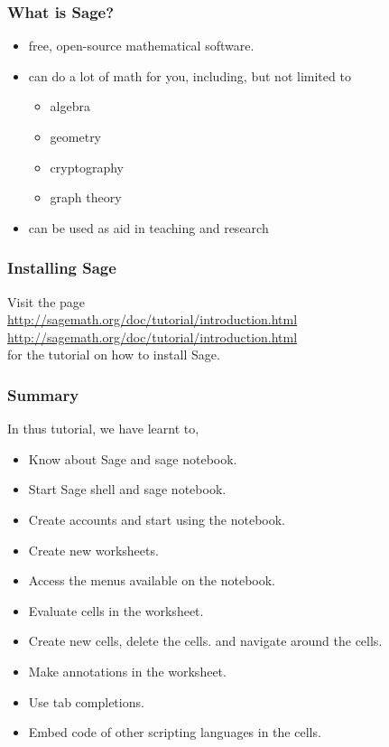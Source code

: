 \documentclass[presentation]{beamer}
\begin{document}
\begin{frame}
\frametitle{What is Sage?}
\label{sec-3}


\begin{itemize}
\item free, open-source mathematical software.
\item can do a lot of math for you, including, but not limited to
\begin{itemize}
\item algebra
\item geometry
\item cryptography
\item graph theory
\end{itemize}
\item can be used as aid in teaching and research
\end{itemize}
\end{frame}
\begin{frame}
\frametitle{Installing Sage}
\label{sec-4}

   Visit the page\\
\vspace{8pt}   
   \url{http://sagemath.org/doc/tutorial/introduction.html}\\
\vspace{5pt}   
   \url{http://sagemath.org/doc/tutorial/introduction.html}\\ 
\vspace{8pt}   
   for the tutorial on how to install Sage.
\end{frame}
\begin{frame}
\frametitle{Summary}
\label{sec-5}

 In thus tutorial, we have learnt to, 


\begin{itemize}
\item Know about Sage and sage notebook.
\item Start Sage shell  and sage notebook.
\item Create accounts and start using the notebook.
\item Create new worksheets.
\item Access the menus available on the notebook.
\item Evaluate cells in the worksheet.
\item Create new cells, delete the cells.
     and navigate around the cells.
\item Make annotations in the worksheet.
\item Use tab completions.
\item Embed code of other scripting languages in the cells.
\end{itemize}
\end{frame}
\end{document}
